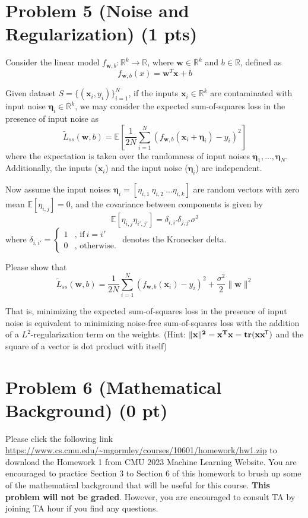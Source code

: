 \documentclass{article}
\newcommand*{\tran}{^{\mkern-1.5mu\mathsf{T}}}
\begin{document}
\section*{Problem 5 (Noise and Regularization) (1 pts)}
Consider the linear model $f_{\mathbf{w},b}: \mathbb{R}^k \rightarrow \mathbb{R}$, where $\mathbf{w} \in \mathbb{R}^k$ and $b \in \mathbb{R}$, defined as
$$f_{\mathbf{w},b}(x) = \mathbf{w}^T \mathbf{x} + b$$

Given dataset $S = \{(\mathbf{x}_i,y_i)\}_{i=1}^N$, if the inputs $\mathbf{x}_i \in \mathbb{R}^k$ are contaminated with input noise $\boldsymbol{\eta}_i \in \mathbb{R}^k$, we may consider the expected sum-of-squares loss in the presence of input noise as 
$${\tilde L}_{ss}(\mathbf{w},b) = \mathbb{E}\left[ \frac{1}{2N}\sum_{i=1}^{N}\left(f_{\mathbf{w},b}(\mathbf{x}_i + \boldsymbol{\eta}_i)-y_i\right)^2 \right]$$
where the expectation is taken over the randomness of input noises $\boldsymbol{\eta}_1,...,\boldsymbol{\eta}_N$. Additionally, the inputs ($\mathbf{x}_i$) and the input noise ($\boldsymbol{\eta}_i$) are independent.

Now assume the input noises $\mathbf{\eta}_i = [\eta_{i,1} ~ \eta_{i,2} ~ ... \eta_{i,k}]$ are random vectors with zero mean $\mathbb{E}[\eta_{i,j}] = 0$, and the covariance between components is given by
$$\mathbb{E}[\eta_{i,j}\eta_{i',j'}] = \delta_{i,i'}\delta_{j,j'} \sigma^2$$
where $\delta_{i,i'} = \left\{\begin{array}{ll} 
1 & \mbox{, if} ~ i = i'\\
0 & \mbox{, otherwise.}
\end{array}\right.$ denotes the Kronecker delta. 

Please show that
$${\tilde L}_{ss}(\mathbf{w},b) = \frac{1}{2N}\sum_{i=1}^{N}\left(f_{\mathbf{w},b}(\mathbf{x}_i)-y_i\right)^2 + \frac{\sigma^2}{2}\|\mathbf{w}\|^2$$

That is, minimizing the expected sum-of-squares loss in the presence of input noise is equivalent to minimizing noise-free sum-of-squares loss with the addition of a $L^2$-regularization term on the weights.
(Hint: $\|\bf{x}\|^2 = {\bf x}^T{\bf x} = tr({\bf x}{\bf x}\tran)$ and the square of a vector is dot product with itself)




\section*{Problem 6 (Mathematical Background) (0 pt)}
Please click the following link \url{https://www.cs.cmu.edu/~mgormley/courses/10601/homework/hw1.zip}
to download the Homework 1 from CMU 2023 Machine Learning Website. You are encouraged to practice Section 3 to Section 6 of this homework to brush up some of the mathematical background that will be useful for this course. \textbf{This problem will not be graded}. However, you are encouraged to consult TA by joining TA hour if you find any questions.
\end{document}
